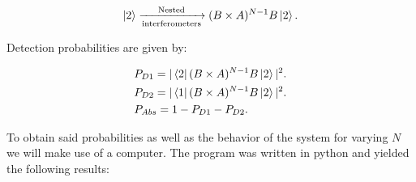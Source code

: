 \documentclass[12pt]{article}
\begin{document}
\begin{equation}\ket{2}\xrightarrow[\text{interferometers}]{\text{Nested}}(B \times A)^{N-1}B \ket{2}.
\end{equation}

Detection probabilities are given by:

\begin{align}
&P_{D1}=|\bra{2} (B \times A)^{N-1}B \ket{2}|^2.\\
&P_{D2}=|\bra{1} (B \times A)^{N-1}B \ket{2}|^2.\\
&P_{Abs}=1-P_{D1}-P_{D2}.
\end{align}
 
 
To obtain said probabilities as well as the behavior of the system for varying $N$ we will make use of a computer. The program was written in python and yielded the following results:
\end{document}
